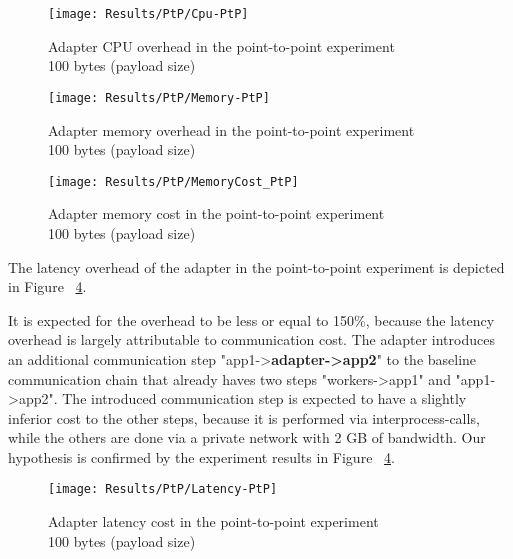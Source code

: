 \begin{figure}[htbp]
    \centering
    \texttt{[image: Results/PtP/Cpu-PtP]}
    \caption{Adapter CPU overhead in the point-to-point experiment \\\hspace{\textwidth} 100 bytes (payload size)}
    \label{fig:cpuPtp}
\end{figure}

\begin{figure}[htbp]
    \centering
    \texttt{[image: Results/PtP/Memory-PtP]}
    \caption{Adapter memory overhead in the point-to-point experiment \\\hspace{\textwidth} 100 bytes (payload size)}
    \label{fig:memPtp}
\end{figure}

\begin{figure}[htbp]
    \centering
    \texttt{[image: Results/PtP/MemoryCost\_PtP]}
    \caption{Adapter memory cost in the point-to-point experiment \\\hspace{\textwidth} 100 bytes (payload size)}
    \label{fig:memCostPtp}
\end{figure}

\newpage

The latency overhead of the adapter in the point-to-point experiment is depicted in Figure ~\ref{fig:latPtP}.

It is expected for the overhead to be less or equal to 150\%, because the latency overhead is largely attributable to communication cost.
The adapter introduces an additional communication step "app1->\textbf{adapter->app2}" to the baseline communication chain that already haves two steps "workers->app1" and "app1->app2".
The introduced communication step is expected to have a slightly inferior cost to the other steps, because it is performed via interprocess-calls, while the others are done via a private network with 2 GB of bandwidth.
Our hypothesis is confirmed by the experiment results in Figure ~\ref{fig:latPtP}.

\begin{figure}[htbp]
    \centering
    \texttt{[image: Results/PtP/Latency-PtP]}
    \caption{Adapter latency cost in the point-to-point experiment \\\hspace{\textwidth} 100 bytes (payload size)}
    \label{fig:latPtP}
\end{figure}

